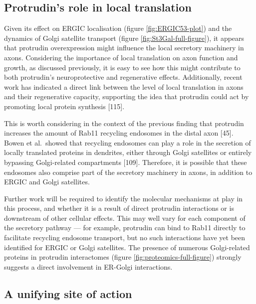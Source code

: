 \documentclass[
  12pt,
  a4paper,
]{book}
\begin{document}
\hypertarget{protrudins-role-in-local-translation}{%
\subsection{Protrudin's role in local translation}\label{protrudins-role-in-local-translation}}

Given its effect on ERGIC localisation (figure \ref{fig:ERGIC53-plot}) and the dynamics of Golgi satellite transport (figure \ref{fig:St3Gal-full-figure}), it appears that protrudin overexpression might influence the local secretory machinery in axons. Considering the importance of local translation on axon function and growth, as discussed previously, it is easy to see how this might contribute to both protrudin's neuroprotective and regenerative effects. Additionally, recent work has indicated a direct link between the level of local translation in axons and their regenerative capacity, supporting the idea that protrudin could act by promoting local protein synthesis {[}115{]}.

This is worth considering in the context of the previous finding that protrudin increases the amount of Rab11 recycling endosomes in the distal axon {[}45{]}. Bowen et al.~showed that recycling endosomes can play a role in the secretion of locally translated proteins in dendrites, either through Golgi satellites or entirely bypassing Golgi-related compartments {[}109{]}. Therefore, it is possible that these endosomes also comprise part of the secretory machinery in axons, in addition to ERGIC and Golgi satellites.

Further work will be required to identify the molecular mechanisms at play in this process, and whether it is a result of direct protrudin interactions or is downstream of other cellular effects. This may well vary for each component of the secretory pathway --- for example, protrudin can bind to Rab11 directly to facilitate recycling endosome transport, but no such interactions have yet been identified for ERGIC or Golgi satellites. The presence of numerous Golgi-related proteins in protrudin interactomes (figure \ref{fig:proteomics-full-figure}) strongly suggests a direct involvement in ER-Golgi interactions.

\hypertarget{a-unifying-site-of-action}{%
\subsection{A unifying site of action}\label{a-unifying-site-of-action}}
\end{document}
